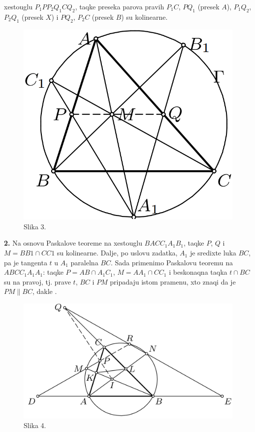\documentclass[11pt,letter]{article}
\begin{document}
xestouglu $P_1PP_2Q_1CQ_2$, taqke preseka parova pravih $P_1C$, $PQ_1$ (presek $A$), $P_1Q_2$, $P_2Q_1$
(presek $X$) i $PQ_2$, $P_2C$ (presek $B$) su \text kolinearne.\\[10mm]
\par
\begin{figure}
\centering
\includegraphics[scale=0.3]{Paskal2.PNG}
\caption*{Slika 3.}
\end{figure}
\textbf{2.} Na osnovu Paskalove teoreme na xestouglu $BACC_1A_1B_1$, taqke $P$, $Q$ i $M = BB1\cap CC1$ su \text kolinearne. Dalje, po uslovu zadatka, $A_1$ je sredixte luka $BC$, pa je tangenta $t$ u $A_1$ paralelna $BC$. Sada primenimo Paskalovu teoremu na $ABCC_1A_1A_1$: taqke $P = AB\cap A_1C_1$, $M = AA_1\cap CC_1$ i beskonaqna taqka $t\cap BC$ su na pravoj, tj. prave $t$, $BC$ i $PM$ \text pripadaju istom pramenu, xto znaqi da je $PM\parallel BC$, dakle .\\[7mm]
\par
\begin{figure}
\centering
\includegraphics[scale=0.23]{Paskal3.PNG}
\caption*{Slika 4.}
\end{figure}
\end{document}
